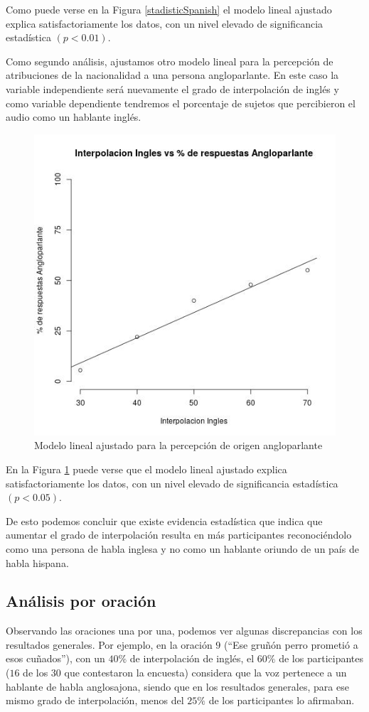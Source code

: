 Como puede verse en la Figura \ref{stadisticSpanish} el modelo lineal ajustado explica satisfactoriamente los datos, con un nivel elevado de significancia estadística $(p<0.01)$.

Como segundo análisis, ajustamos otro modelo lineal para la percepción de atribuciones de la nacionalidad a una persona angloparlante. En este caso la variable independiente será nuevamente el grado de interpolación de inglés y como variable dependiente tendremos el porcentaje de sujetos que percibieron el audio como un hablante inglés.

\begin{figure}
\begin{center}
\includegraphics[trim={0 0 0 1.5cm},clip,width=.5\textwidth]{imagenes/estadistica/english.jpg}
\end{center}
\caption{Modelo lineal ajustado para la percepción de origen angloparlante}
\label{stadisticEnglish}
\end{figure}

En la Figura \ref{stadisticEnglish} puede verse que el modelo lineal ajustado explica satisfactoriamente los datos, con un nivel elevado de significancia estadística $(p<0.05)$.

De esto podemos concluir que existe evidencia estadística que indica que aumentar el grado de interpolación resulta en más participantes reconociéndolo como una persona de habla inglesa y no como un hablante oriundo de un país de habla hispana.

\subsection{Análisis por oración}

Observando las oraciones una por una, podemos ver algunas discrepancias con los resultados generales. Por ejemplo, en la oración $9$ (``Ese gruñón perro prometió a esos cuñados''), con un $40\%$ de interpolación de inglés, el $60\%$ de los participantes ($16$ de los $30$ que contestaron la encuesta) considera que la voz pertenece a un hablante de habla anglosajona, siendo que en los resultados generales, para ese mismo grado de interpolación, menos del $25\%$ de los participantes lo afirmaban.


